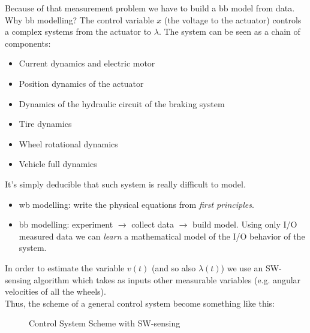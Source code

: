 Because of that measurement problem we have to build a \acrlong{bb} model from data.\\

Why \acrlong{bb} modelling?
The control variable $x$ (the voltage to the actuator) controls a complex systems from the actuator to $\lambda$.
The system can be seen as a chain of components:
\begin{itemize}
    \item Current dynamics and electric motor
    \item Position dynamics of the actuator
    \item Dynamics of the hydraulic circuit of the braking system
    \item Tire dynamics
    \item Wheel rotational dynamics
    \item Vehicle full dynamics
\end{itemize}

It's simply deducible that such system is really difficult to model.

\begin{recall}
    \hfill \break
    \begin{itemize}
	   \item \gls{wb} modelling: write the physical equations from \emph{first principles}.
	   \item \gls{bb} modelling: experiment $\rightarrow$ collect data $\rightarrow$ build model.
        Using only I/O measured data we can \emph{learn} a mathematical model of the I/O behavior of the system.
    \end{itemize}
\end{recall}

In order to estimate the variable $v(t)$ (and so also $\lambda(t)$) we use an SW-sensing algorithm which takes as inputs other measurable variables (e.g. angular velocities of all the wheels). \\
Thus, the scheme of a general control system become something like this: 

\begin{figure}[H]
    \centering
    \vspace{5pt}
	\caption*{Control System Scheme with SW-sensing}
\end{figure}

